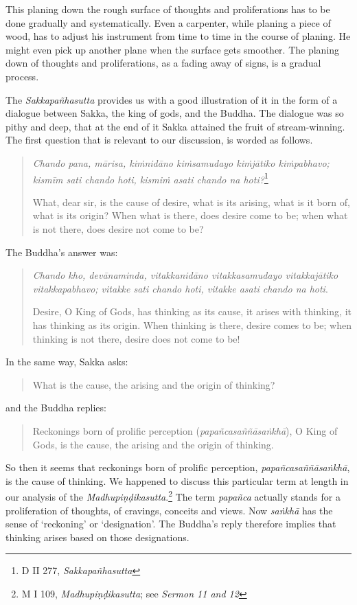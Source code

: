This planing down the rough surface of thoughts and proliferations has to be done gradually and systematically. Even a carpenter, while planing a piece of wood, has to adjust his instrument from time to time in the course of planing. He might even pick up another plane when the surface gets smoother. The planing down of thoughts and proliferations, as a fading away of signs, is a gradual process.

The \emph{Sakkapañhasutta} provides us with a good illustration of it in the form of a dialogue between Sakka, the king of gods, and the Buddha. The dialogue was so pithy and deep, that at the end of it Sakka attained the fruit of stream-winning. The first question that is relevant to our discussion, is worded as follows.

\begin{quote}
\emph{Chando pana, mārisa, kiṁnidāno kiṁsamudayo kiṁjātiko kiṁpabhavo; kismīm sati chando hoti, kismiṁ asati chando na hoti?}\footnote{D II 277, \emph{Sakkapañhasutta}}

What, dear sir, is the cause of desire, what is its arising, what is it born of, what is its origin? When what is there, does desire come to be; when what is not there, does desire not come to be?
\end{quote}

The Buddha's answer was:

\begin{quote}
\emph{Chando kho, devānaminda, vitakkanidāno vitakkasamudayo vitakkajātiko vitakkapabhavo; vitakke sati chando hoti, vitakke asati chando na hoti}.

Desire, O King of Gods, has thinking as its cause, it arises with thinking, it has thinking as its origin. When thinking is there, desire comes to be; when thinking is not there, desire does not come to be!
\end{quote}

In the same way, Sakka asks:

\begin{quote}
What is the cause, the arising and the origin of thinking?
\end{quote}

and the Buddha replies:

\begin{quote}
Reckonings born of prolific perception (\emph{papañcasaññāsaṅkhā}), O King of Gods, is the cause, the arising and the origin of thinking.
\end{quote}

So then it seems that reckonings born of prolific perception, \emph{papañcasaññāsaṅkhā}, is the cause of thinking. We happened to discuss this particular term at length in our analysis of the \emph{Madhupiṇḍikasutta}.\footnote{M I 109, \emph{Madhupiṇḍikasutta}; see \emph{Sermon 11 and 12}} The term \emph{papañca} actually stands for a proliferation of thoughts, of cravings, conceits and views. Now \emph{saṅkhā} has the sense of `reckoning' or `designation'. The Buddha's reply therefore implies that thinking arises based on those designations.

